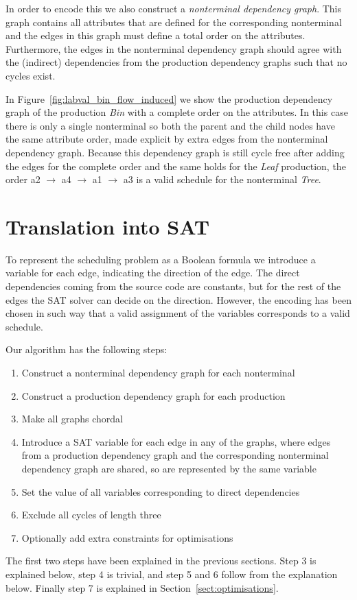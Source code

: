 \documentclass{llncs}
\newcommand{\figref}[1]{Figure~\ref{#1}}
\newcommand{\sectref}[1]{Section~\ref{#1}}
\begin{document}
In order to encode this we also construct a \emph{nonterminal dependency graph}. This graph contains all attributes that are defined for the corresponding nonterminal and the edges in this graph must define a total order on the attributes. Furthermore, the edges in the nonterminal dependency graph should agree with the (indirect) dependencies from the production dependency graphs such that no cycles exist.


In \figref{fig:labval_bin_flow_induced} we show the production dependency graph of the production \emph{Bin} with a complete order on the attributes. In this case there is only a single nonterminal so both the parent and the child nodes have the same attribute order, made explicit by extra edges from the nonterminal dependency graph. Because this dependency graph is still cycle free after adding the edges for the complete order and the same holds for the \emph{Leaf} production, the order a2 $\rightarrow$ a4 $\rightarrow$ a1 $\rightarrow$ a3 is a valid schedule for the nonterminal \emph{Tree}.


\section{Translation into SAT} \label{sect:translation}
To represent the scheduling problem as a Boolean formula we introduce a variable for each edge, indicating the direction of the edge. The direct dependencies coming from the source code are constants, but for the rest of the edges the SAT solver can decide on the direction. However, the encoding has been chosen in such way that a valid assignment of the variables corresponds to a valid schedule.

Our algorithm has the following steps:
\begin{enumerate}
\item Construct a nonterminal dependency graph for each nonterminal
\item Construct a production dependency graph for each production
\item Make all graphs chordal
\item Introduce a SAT variable for each edge in any of the graphs, where edges from a production dependency graph and the corresponding nonterminal dependency graph are shared, so are represented by the same variable
\item Set the value of all variables corresponding to direct dependencies
\item Exclude all cycles of length three
\item Optionally add extra constraints for optimisations
\end{enumerate}
The first two steps have been explained in the previous sections. Step 3 is explained below, step 4 is trivial, and step 5 and 6 follow from the explanation below. Finally step 7 is explained in \sectref{sect:optimisations}.
\end{document}
